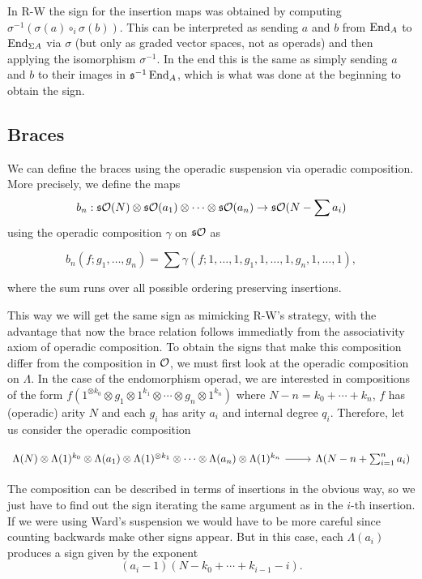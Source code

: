 \documentclass[twoside]{article}
\begin{document}
In R-W the sign for the insertion maps was obtained by computing $\sigma^{-1}(\sigma(a)\circ_i\sigma(b))$. This can be interpreted as sending $a$ and $b$ from $\operatorname{End}_A$ to $\operatorname{End}_{\Sigma A}$ via $\sigma$ (but only as graded vector spaces, not as operads) and then applying the isomorphism $\sigma^{-1}$. In the end this is the same as simply sending $a$ and $b$ to their images in $\mathfrak{s}^{-1}\operatorname{End}_A$, which is what was done at the beginning to obtain the sign.
\subsection{Braces}
We can define the braces using the operadic suspension via operadic composition. More precisely, we define the maps 
$$b_n:\mathfrak{s}{\mathcal O}(N)\otimes\mathfrak{s}{\mathcal O}(a_1)\otimes\cdots\otimes\mathfrak{s}{\mathcal O}(a_n)\to\mathfrak{s}{\mathcal O}(N-\sum a_i)$$
using the operadic composition $\gamma$ on $\mathfrak{s}{\mathcal O}$ as

$$b_n(f;g_1,\dots,g_n)=\sum\gamma(f;1,\dots,1,g_1,1,\dots,1,g_n,1,\dots,1),$$

where the sum runs over all possible ordering preserving insertions. 

 This way we will get the same sign as mimicking R-W's strategy, with the advantage that now the brace relation follows immediatly from the associativity axiom of operadic composition. To obtain the signs that make this composition differ from the composition in ${\mathcal O}$, we must first look at the operadic composition on $\Lambda$. In the case of the endomorphism operad, we are interested in compositions of the form $f(1^{\otimes k_0}\otimes g_1\otimes 1^{k_1}\otimes\cdots\otimes g_n\otimes 1^{k_n})$ where $N-n=k_0+\cdots+k_n$, $f$ has (operadic) arity $N$ and each $g_i$ has arity $a_i$ and internal degree $q_i$. Therefore, let us consider the operadic composition

\[
\begin{tikzcd}
\Lambda(N)\otimes\Lambda(1)^{k_0}\otimes\Lambda(a_1)\otimes\Lambda(1)^{\otimes k_1}\otimes\cdots\otimes\Lambda(a_n)\otimes\Lambda(1)^{k_n}\arrow[r] & \Lambda(N-n+\sum_{i=1}^na_i)
\end{tikzcd}
\]

The composition can be described in terms of insertions in the obvious way, so we just have to find out the sign iterating the same argument as in the $i$-th insertion. If we were using Ward's suspension we would have to be more careful since counting backwards make other signs appear. But in this case, each $\Lambda(a_i)$ produces a sign given by the exponent $$(a_i-1)(N-k_0+\cdots+k_{i-1}-i).$$ 
\end{document}
